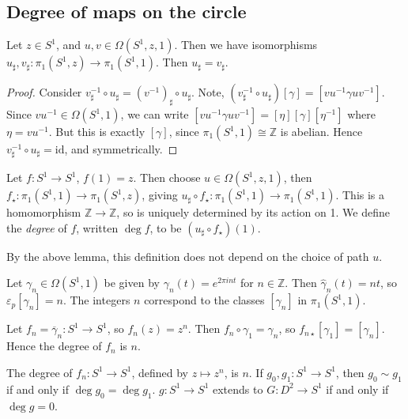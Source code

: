 \subsection{Degree of maps on the circle}
\begin{lemma}
	Let \( z \in S^1 \), and \( u, v \in \Omega(S^1, z, 1) \).
	Then we have isomorphisms \( u_\sharp, v_\sharp \colon \pi_1(S^1, z) \to \pi_1(S^1, 1) \).
	Then \( u_\sharp = v_\sharp \).
\end{lemma}
\begin{proof}
	Consider \( v_\sharp^{-1} \circ u_\sharp = (v^{-1})_\sharp \circ u_\sharp \).
	Note, \( (v_\sharp^{-1} \circ u_\sharp)[\gamma] = [vu^{-1}\gamma uv^{-1}] \).
	Since \( vu^{-1} \in \Omega(S^1, 1) \), we can write \( [vu^{-1}\gamma uv^{-1}] = [\eta][\gamma][\eta^{-1}] \) where \( \eta = vu^{-1} \).
	But this is exactly \( [\gamma] \), since \( \pi_1(S^1,1) \cong \mathbb Z \) is abelian.
	Hence \( v_\sharp^{-1} \circ u_\sharp = \mathrm{id} \), and symmetrically.
\end{proof}
\begin{definition}
	Let \( f \colon S^1 \to S^1 \), \( f(1) = z \).
	Then choose \( u \in \Omega(S^1, z, 1) \), then \( f_\star \colon \pi_1(S^1,1) \to \pi_1(S^1,z) \), giving \( u_\sharp \circ f_\star \colon \pi_1(S^1, 1) \to \pi_1(S^1, 1) \).
	This is	a homomorphism \( \mathbb Z \to \mathbb Z \), so is uniquely determined by its action on 1.
	We define the \emph{degree} of \( f \), written \( \deg f \), to be \( (u_\sharp \circ f_\star)(1) \).
\end{definition}
By the above lemma, this definition does not depend on the choice of path \( u \).
\begin{example}
	Let \( \gamma_n \in \Omega(S^1,1) \) be given by \( \gamma_n(t) = e^{2\pi i n t} \) for \( n \in \mathbb Z \).
	Then \( \hat \gamma_n(t) = n t \), so \( \varepsilon_p[\gamma_n] = n \).
	The integers \( n \) correspond to the classes \( [\gamma_n] \) in \( \pi_1(S^1,1) \).

	Let \( f_n = \overline \gamma_n \colon S^1 \to S^1 \), so \( f_n(z) = z^n \).
	Then \( f_n \circ \gamma_1 = \gamma_n \), so \( f_{n\star}[\gamma_1] = [\gamma_n] \).
	Hence the degree of \( f_n \) is \( n \).
\end{example}
\begin{proposition}
	The degree of \( f_n : S^1 \to S^1 \), defined by \( z \mapsto z^n \), is \( n \).
	If \( g_0, g_1 \colon S^1 \to S^1 \), then \( g_0 \sim g_1 \) if and only if \( \deg g_0 = \deg g_1 \).
	\( g \colon S^1 \to S^1 \) extends to \( G \colon D^2 \to S^1 \) if and only if \( \deg g = 0 \).
\end{proposition}
